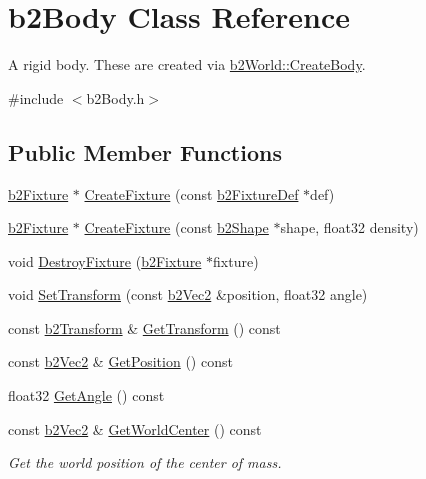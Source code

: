 \hypertarget{classb2_body}{}\section{b2\+Body Class Reference}
\label{classb2_body}


A rigid body. These are created via \hyperlink{classb2_world_a2eb36e967e43294bfa03ec3d177c2dae}{b2\+World\+::\+Create\+Body}.  




{\ttfamily \#include $<$b2\+Body.\+h$>$}

\subsection*{Public Member Functions}
\begin{DoxyCompactItemize}
\item 
\hyperlink{classb2_fixture}{b2\+Fixture} $\ast$ \hyperlink{classb2_body_aa4892301e9b9d62ede5e93dad1743894}{Create\+Fixture} (const \hyperlink{structb2_fixture_def}{b2\+Fixture\+Def} $\ast$def)
\item 
\hyperlink{classb2_fixture}{b2\+Fixture} $\ast$ \hyperlink{classb2_body_a52d971867086d5db79769a62bbb70a60}{Create\+Fixture} (const \hyperlink{classb2_shape}{b2\+Shape} $\ast$shape, float32 density)
\item 
void \hyperlink{classb2_body_a856d1df86b7bded91f02d8cfcaea1c2f}{Destroy\+Fixture} (\hyperlink{classb2_fixture}{b2\+Fixture} $\ast$fixture)
\item 
void \hyperlink{classb2_body_a4686f32bbce5723761e9719c706eca11}{Set\+Transform} (const \hyperlink{structb2_vec2}{b2\+Vec2} \&position, float32 angle)
\item 
const \hyperlink{structb2_transform}{b2\+Transform} \& \hyperlink{classb2_body_afb316448e6e555ceb2df23ed216b2f53}{Get\+Transform} () const
\item 
const \hyperlink{structb2_vec2}{b2\+Vec2} \& \hyperlink{classb2_body_a7944dc953ac0cb1e00b32bc61b50e70d}{Get\+Position} () const
\item 
float32 \hyperlink{classb2_body_a20b9c8d0d722edf3af281034d37bd534}{Get\+Angle} () const
\item 
\mbox{\label{classb2_body_a3e14cfe61c63913ef7b0f719f7145318}} 
const \hyperlink{structb2_vec2}{b2\+Vec2} \& \hyperlink{classb2_body_a3e14cfe61c63913ef7b0f719f7145318}{Get\+World\+Center} () const
\begin{DoxyCompactList}\small\item\em Get the world position of the center of mass. \end{DoxyCompactList}\item 

\end{DoxyCompactItemize}
